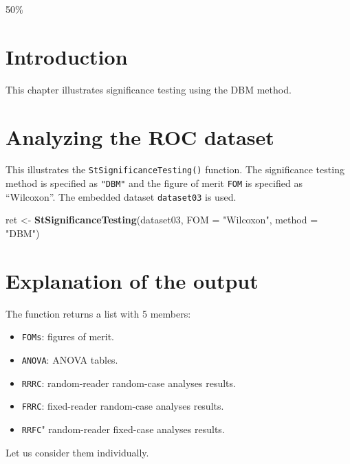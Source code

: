 \documentclass[
]{book}
\newenvironment{Shaded}{\begin{snugshade}}{\end{snugshade}}
\newcommand{\DataTypeTok}[1]{\textcolor[rgb]{0.13,0.29,0.53}{#1}}
\newcommand{\KeywordTok}[1]{\textcolor[rgb]{0.13,0.29,0.53}{\textbf{#1}}}
\newcommand{\NormalTok}[1]{#1}
\newcommand{\StringTok}[1]{\textcolor[rgb]{0.31,0.60,0.02}{#1}}
\providecommand{\tightlist}{%
  \setlength{\itemsep}{0pt}\setlength{\parskip}{0pt}}
\begin{document}
50\%

\hypertarget{quick-start-dbm-text-intro}{%
\section{Introduction}\label{quick-start-dbm-text-intro}}

This chapter illustrates significance testing using the DBM method.

\hypertarget{quick-start-dbm-text-analyze-dataset}{%
\section{Analyzing the ROC dataset}\label{quick-start-dbm-text-analyze-dataset}}

This illustrates the \texttt{StSignificanceTesting()} function. The significance testing method is specified as \texttt{"DBM"} and the figure of merit \texttt{FOM} is specified as ``Wilcoxon''. The embedded dataset \texttt{dataset03} is used.

\begin{Shaded}
\begin{Highlighting}[]
\NormalTok{ret <-}\StringTok{ }\KeywordTok{StSignificanceTesting}\NormalTok{(dataset03, }\DataTypeTok{FOM =} \StringTok{"Wilcoxon"}\NormalTok{, }\DataTypeTok{method =} \StringTok{"DBM"}\NormalTok{)}
\end{Highlighting}
\end{Shaded}

\hypertarget{quick-start-dbm-text-explanation}{%
\section{Explanation of the output}\label{quick-start-dbm-text-explanation}}

The function returns a list with 5 members:

\begin{itemize}
\tightlist
\item
  \texttt{FOMs}: figures of merit.
\item
  \texttt{ANOVA}: ANOVA tables.
\item
  \texttt{RRRC}: random-reader random-case analyses results.
\item
  \texttt{FRRC}: fixed-reader random-case analyses results.
\item
  \texttt{RRFC}" random-reader fixed-case analyses results.
\end{itemize}

Let us consider them individually.
\end{document}
